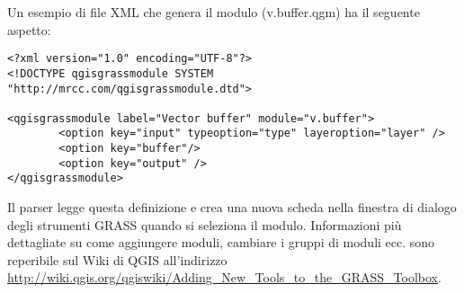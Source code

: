 Un esempio di file XML che genera il modulo  (v.buffer.qgm)
ha il seguente aspetto:

\begin{verbatim}
<?xml version="1.0" encoding="UTF-8"?>
<!DOCTYPE qgisgrassmodule SYSTEM "http://mrcc.com/qgisgrassmodule.dtd">

<qgisgrassmodule label="Vector buffer" module="v.buffer">
        <option key="input" typeoption="type" layeroption="layer" />
        <option key="buffer"/>
        <option key="output" />
</qgisgrassmodule>
\end{verbatim}

Il parser legge questa definizione e crea una nuova scheda nella finestra di 
dialogo degli strumenti GRASS quando si seleziona il modulo. 
Informazioni più dettagliate su come aggiungere moduli, cambiare i gruppi di moduli ecc. 
sono reperibile sul Wiki di QGIS all'indirizzo \\
\url{http://wiki.qgis.org/qgiswiki/Adding\_New\_Tools\_to\_the\_GRASS\_Toolbox}.

\FloatBarrier